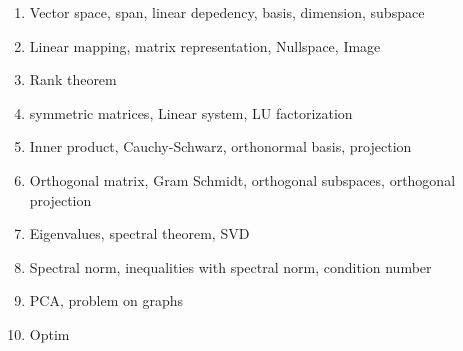 \documentclass[10pt,nocut]{article}
\title{}
\author{}
\date{}
\begin{document}
\begin{enumerate}
	\item Vector space, span, linear depedency, basis, dimension, subspace
	\item Linear mapping, matrix representation, Nullspace, Image
	\item Rank theorem
	\item symmetric matrices, Linear system, LU factorization
	\item Inner product, Cauchy-Schwarz, orthonormal basis, projection
	\item Orthogonal matrix, Gram Schmidt, orthogonal subspaces, orthogonal projection
	\item Eigenvalues, spectral theorem, SVD
	\item Spectral norm, inequalities with spectral norm, condition number
	\item PCA, problem on graphs
	\item Optim

\end{enumerate}


%
%
\end{document}
